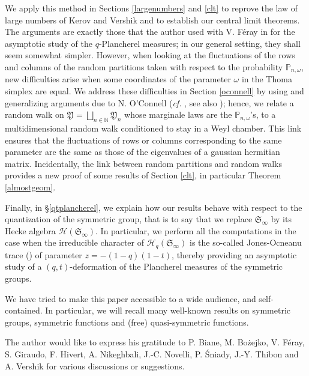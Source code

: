 \documentclass[smallextended,nospthms]{svjour3}
\theoremstyle{remark}
\newcommand{\N}{\mathbb{N}}
\newcommand{\hecke}{\mathscr{H}}
\newcommand{\sym}{\mathfrak{S}}
\newcommand{\ym}{\mathfrak{Y}}
\newcommand{\proba}{\mathbb{P}}
\begin{document}
We apply this method in Sections \ref{largenumbers} and \ref{clt} to reprove the law of large numbers of Kerov and Vershik and to establish our central limit theorems. The arguments are exactly those that the author used with V. F\'eray in \cite{FM10} for the asymptotic study of the $q$-Plancherel measures; in our general setting, they shall seem somewhat simpler. However, when looking at the fluctuations of the rows and columns of the random partitions taken with respect to the probability $\proba_{n,\omega}$, new difficulties arise when some coordinates of the parameter $\omega$ in the Thoma simplex are equal. We address these difficulties in Section \ref{oconnell} by using and generalizing arguments due to N. O'Connell (\emph{cf.} \cite{OC03}, see also \cite{Litt95,OCY02,BBO05,Bia09}); hence, we relate a random walk on $\ym=\bigsqcup_{n \in \N} \ym_{n}$ whose marginale laws are the $\proba_{n,\omega}$'s, to a multidimensional random walk  conditioned to stay in a Weyl chamber. This link ensures that the fluctuations of rows or columns corresponding to the same parameter are the same as those of the eigenvalues of a gaussian hermitian matrix. Incidentally, the link between random partitions and random walks provides a new proof of some results of Section \ref{clt}, in particular Theorem \ref{almostgeom}.\bigskip

Finally, in \S\ref{qtplancherel}, we explain how our results behave with respect to the quantization of the symmetric group, that is to say that we replace $\sym_{\infty}$ by its Hecke algebra $\hecke(\sym_{\infty})$. In particular, we perform all the computations in the case when the irreducible character of $\hecke_{q}(\sym_{\infty})$ is the so-called Jones-Ocneanu trace (\cite{Jon87}) of parameter $z=-(1-q)(1-t)$, thereby providing an asymptotic study of a $(q,t)$-deformation of the Plancherel measures of the symmetric groups.\bigskip

We have tried to make this paper accessible to a wide audience, and self-contained. In particular, we will recall many well-known results on symmetric groups, symmetric functions and (free) quasi-symmetric functions. 


\bigskip
\begin{acknowledgements}
The author would like to express his gratitude to P. Biane, M. Bo\.{z}ejko, V. F\'eray, S. Giraudo, F. Hivert, A. Nikeghbali, J.-C. Novelli, P. \'Sniady, J.-Y. Thibon and A. Vershik for various discussions or suggestions.
\end{acknowledgements}
\bigskip
\end{document}
